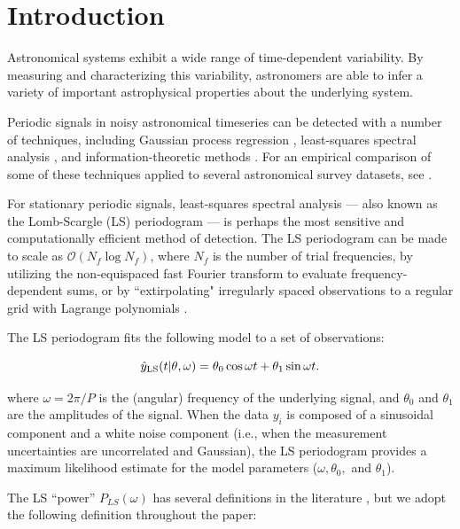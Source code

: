 \documentclass[apj]{emulateapj}
\newcommand{\bigO}{\mathcal{O}}
\begin{document}
\section{Introduction}\label{sec:introduction}

Astronomical systems exhibit a wide range of time-dependent variability. By measuring and
characterizing this variability, astronomers are able to infer a variety of important
astrophysical properties about the underlying system.

Periodic signals in noisy astronomical timeseries can be detected with a number of techniques,
including Gaussian process regression \citep{Foreman-Mackey_etal_2017,Rasmussen+Williams_2006},
least-squares spectral analysis \citep{Lomb_1976,Scargle_1982,Barning_1963,Vanicek_1971}, and
information-theoretic methods \citep{Graham_etal_2013b,Huijse_etal_2012,Cincotta_etal_1995}. For an empirical
comparison of some of these techniques applied to several astronomical survey datasets, see
\cite{Graham_etal_2013}.

For stationary periodic signals, least-squares spectral analysis --- also known as
the Lomb-Scargle (LS) periodogram \citep{Lomb_1976,Scargle_1982,Barning_1963,Vanicek_1971} ---
is perhaps the most sensitive and computationally efficient method of detection. The LS periodogram
can be made to scale as $\bigO(N_f\log N_f)$, where $N_f$ is the number of trial frequencies, by
utilizing the non-equispaced fast Fourier transform \citep[][NFFT]{NFFT_KKD2009,NFFT_DR1993} to evaluate frequency-dependent
sums, or by ``extirpolating" irregularly spaced observations to a regular grid with Lagrange polynomials \citep{Press+Rybicki_1989}.

The LS periodogram fits the following model to a set of observations:

\begin{equation}
    \hat{y}_{\rm LS}(t|\theta, \omega) = \theta_0\cos{\omega t} + \theta_1\sin{\omega t}.
\end{equation}

where $\omega = 2\pi / P$ is the (angular) frequency of the underlying signal, and $\theta_0$ and
$\theta_1$ are the amplitudes of the signal. When the data $y_i$ is composed of a sinusoidal
component and a white noise component (i.e., when the measurement uncertainties are uncorrelated and
Gaussian), the LS periodogram provides a maximum likelihood estimate for the model parameters ($\omega, \theta_0,$ and
$\theta_1$).

The LS ``power'' $P_{LS}(\omega)$ has several definitions
in the literature \citep{Zechmeister+Kurster_2009}, but we adopt the following definition throughout the paper:
\end{document}
